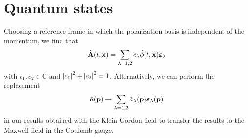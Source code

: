 \section{Quantum states}

Choosing a reference frame in which the polarization basis is independent of the momentum, we find that
\begin{equation}
	\hat{\vb{A}}(t,\vb{x})
	=
	\sum_{\lambda=1,2}
	c_\lambda
	\hat\phi(t,\vb{x})
	\boldsymbol{\varepsilon}_\lambda
\end{equation}
with $c_1,c_2\in\mathbb{C}$ and $\abs{c_1}^2+\abs{c_2}^2=1$.
Alternatively, we can perform the replacement
\begin{equation}
	\hat{a}(\vb{p})
	\to
	\sum_{\lambda=1,2}
	\hat{a}_\lambda(\vb{p})
	\boldsymbol{\varepsilon}_\lambda(\vb{p})
\end{equation}
in our results obtained with the Klein-Gordon field to transfer the results to the Maxwell field in the Coulomb gauge.